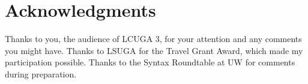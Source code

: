 \documentclass[charis,linguex,biblatex]{glossa}
\begin{document}
\theendnotes

\section*{Acknowledgments}

\small{Thanks to you, the audience of LCUGA 3, for your attention and any comments you might have. Thanks to LSUGA for the Travel Grant Award, which made my participation possible. Thanks to the Syntax Roundtable at UW for comments during preparation.}




\nocite{*} %

\printbibliography %
\end{document}

